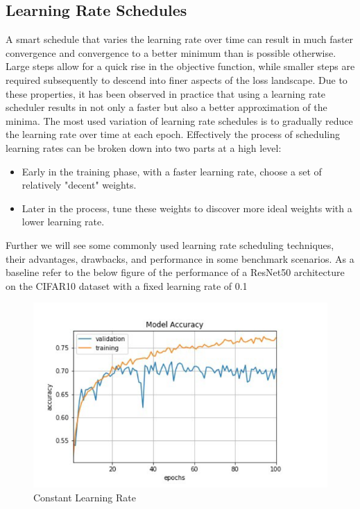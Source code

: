 \subsection{Learning Rate Schedules}
A smart schedule that varies the learning rate over time can result in much faster convergence and convergence to a better minimum than is possible otherwise. Large steps allow for a quick rise in the objective function, while smaller steps are required subsequently to descend into finer aspects of the loss landscape. Due to these properties, it has been observed in practice that using a learning rate scheduler results in not only a faster but also a better approximation of the minima. The most used variation of learning rate schedules is to gradually reduce the learning rate over time at each epoch. Effectively the process of scheduling learning rates can be broken down into two parts at a high level:
\begin{itemize}
    \item Early in the training phase, with a faster learning rate, choose a set of relatively "decent" weights.
    \item Later in the process, tune these weights to discover more ideal weights with a lower learning rate.
\end{itemize}
Further we will see some commonly used learning rate scheduling techniques, their advantages, drawbacks, and performance in some benchmark scenarios. As a baseline refer to the below figure of the performance of a ResNet50 architecture on the CIFAR10 dataset with a fixed learning rate of 0.1
\begin{figure}[!ht]
    \centering
    \includegraphics[scale=0.7]{./imgs/2019A7PS0097P-02.png}
    \caption{Constant Learning Rate}
    \label{fig:const_learn_rate}
\end{figure}

